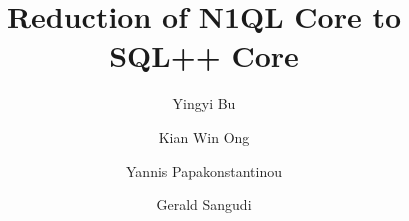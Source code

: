 \documentclass{article}
\begin{document}
\title{Reduction of N1QL Core to SQL++ Core}

\author{Yingyi Bu \and Kian Win Ong \and Yannis Papakonstantinou \and Gerald Sangudi}%

\maketitle

\begin{sloppypar}





\end{sloppypar}




\end{document}
